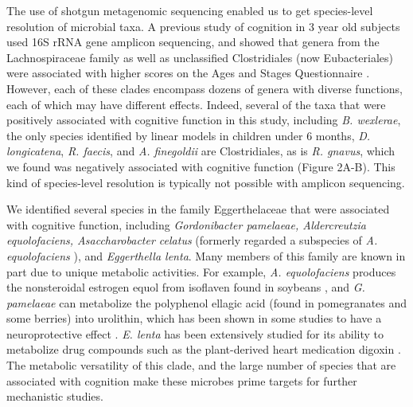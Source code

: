 \documentclass[a4paper]{article}
\begin{document}
The use of shotgun metagenomic sequencing enabled us to get
species-level resolution of microbial taxa. A previous study of
cognition in 3 year old subjects used 16S rRNA gene amplicon sequencing,
and showed that genera from the Lachnospiraceae family as well as
unclassified Clostridiales (now Eubacteriales) were associated with
higher scores on the Ages and Stages Questionnaire
\cite{sordilloAssociationInfantGut2019}.
However, each of these clades encompass dozens of genera with
diverse functions, each of which may have different effects. Indeed,
several of the taxa that were positively associated with cognitive
function in this study, including \emph{B. wexlerae}, the only species
identified by linear models in children under 6 months, \emph{D.
longicatena}, \emph{R. faecis}, and \emph{A. finegoldii} are
Clostridiales, as is \emph{R. gnavus}, which we found was negatively
associated with cognitive function (Figure 2A-B). This kind of
species-level resolution is typically not possible with amplicon
sequencing.

We identified several species in the family Eggerthelaceae that were
associated with cognitive function, including \emph{Gordonibacter
pamelaeae, Aldercreutzia equolofaciens, Asaccharobacter celatus}
(formerly regarded a subspecies of \emph{A. equolofaciens}
\cite{takahashiCompleteGenomeSequence2021}),
and \emph{Eggerthella lenta}. Many members of this family are
known in part due to unique metabolic activities. For example, \emph{A.
equolofaciens} produces the nonsteroidal estrogen equol from isoflaven
found in soybeans
\cite{wangEnantioselectiveSynthesisSEquol2005},
and \emph{G. pamelaeae} can metabolize the polyphenol ellagic acid
(found in pomegranates and some berries) into urolithin, which has been
shown in some studies to have a neuroprotective effect
\cite{gongUrolithinAlleviatesBloodbrain2022,selmaDescriptionUrolithinProduction2014}.
\emph{E. lenta} has been extensively studied for
its ability to metabolize drug compounds such as the plant-derived heart
medication digoxin
\cite{haiserPredictingManipulatingCardiac2013}.
The metabolic versatility of this clade, and the large number of
species that are associated with cognition make these microbes prime
targets for further mechanistic studies.
\end{document}
